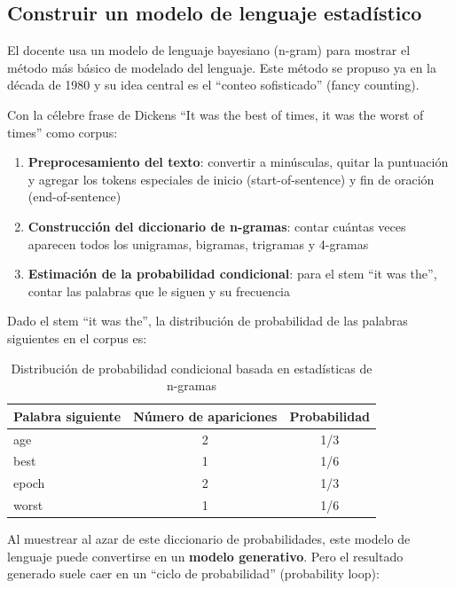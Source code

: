 \documentclass[a4paper]{article}
\begin{document}
\subsection{Construir un modelo de lenguaje estadístico}

El docente usa un modelo de lenguaje bayesiano (n-gram) para mostrar el método más básico de modelado del lenguaje. Este método se propuso ya en la década de 1980 y su idea central es el ``conteo sofisticado'' (fancy counting).

Con la célebre frase de Dickens ``It was the best of times, it was the worst of times'' como corpus:

\begin{enumerate}
    \item \textbf{Preprocesamiento del texto}: convertir a minúsculas, quitar la puntuación y agregar los tokens especiales de inicio (start-of-sentence) y fin de oración (end-of-sentence)
    \item \textbf{Construcción del diccionario de n-gramas}: contar cuántas veces aparecen todos los unigramas, bigramas, trigramas y 4-gramas
    \item \textbf{Estimación de la probabilidad condicional}: para el stem ``it was the'', contar las palabras que le siguen y su frecuencia
\end{enumerate}

Dado el stem ``it was the'', la distribución de probabilidad de las palabras siguientes en el corpus es:

\begin{table}[H]
\centering
\begin{tabular}{lcc}
\toprule
\textbf{Palabra siguiente} & \textbf{Número de apariciones} & \textbf{Probabilidad} \\
\midrule
age       & 2 & 1/3 \\
best      & 1 & 1/6 \\
epoch     & 2 & 1/3 \\
worst     & 1 & 1/6 \\
\bottomrule
\end{tabular}
\caption{Distribución de probabilidad condicional basada en estadísticas de n-gramas}
\end{table}

Al muestrear al azar de este diccionario de probabilidades, este modelo de lenguaje puede convertirse en un \textbf{modelo generativo}. Pero el resultado generado suele caer en un ``ciclo de probabilidad'' (probability loop):
\end{document}
